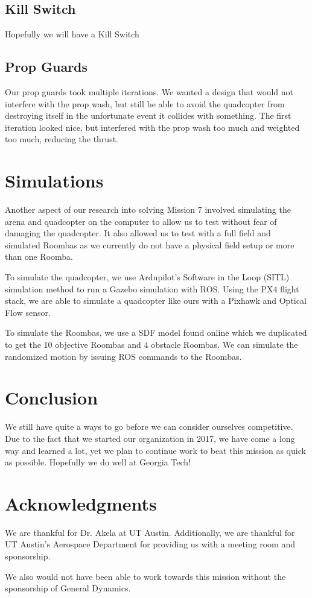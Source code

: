 \documentclass[12pt]{article}
\begin{document}
\subsection{Kill Switch}
Hopefully we will have a Kill Switch 

\subsection{Prop Guards}
Our prop guards took multiple iterations. We wanted a design that would not interfere with the prop wash, but still be able to avoid the quadcopter from destroying itself in the unfortunate event it collides with something. The first iteration looked nice, but interfered with the prop wash too much and weighted too much, reducing the thrust. 

\section{Simulations}
Another aspect of our research into solving Mission 7 involved simulating the arena and quadcopter on the computer to allow us to test without fear of damaging the quadcopter. It also allowed us to test with a full field and simulated Roombas as we currently do not have a physical field setup or more than one Roomba. 

To simulate the quadcopter, we use Ardupilot's Software in the Loop (SITL) simulation method to run a Gazebo simulation with ROS. Using the PX4 flight stack, we are able to simulate a quadcopter like ours with a Pixhawk and Optical Flow sensor. 

To simulate the Roombas, we use a SDF model found online which we duplicated to get the 10 objective Roombas and 4 obstacle Roombas. We can simulate the randomized motion by issuing ROS commands to the Roombas. 

\section{Conclusion}
We still have quite a ways to go before we can consider ourselves competitive. Due to the fact that we started our organization in 2017, we have come a long way and learned a lot, yet we plan to continue work to beat this mission as quick as possible. Hopefully we do well at Georgia Tech! 

\section{Acknowledgments}
We are thankful for Dr. Akela at UT Austin. Additionally, we are thankful for UT Austin's Aerospace Department for providing us with a meeting room and sponsorship. 

We also would not have been able to work towards this mission without the sponsorship of General Dynamics. 

 
\end{document}
